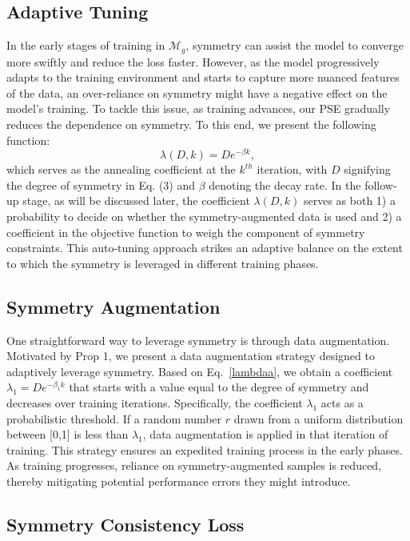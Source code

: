 \documentclass[letterpaper]{article} %
\theoremstyle{definition}
\begin{document}
\subsection{Adaptive Tuning}
In the early stages of training in $\mathcal{M}_g$, symmetry can assist the model to converge more swiftly and reduce the loss faster. However, as the model progressively adapts to the training environment and starts to capture more nuanced features of the data, an over-reliance on symmetry might have a negative effect on the model's training. To tackle this issue, as training advances, our PSE gradually reduces the dependence on symmetry. To this end, we present the following function:
\begin{equation}
\lambda (D,k) = D e^{-\beta k}, \label{lambdaa}
\end{equation}
which serves as the annealing coefficient at the $ k^{th}$ iteration, with $D$ signifying the degree of symmetry in Eq. (3) and $\beta$ denoting the decay rate. In the follow-up stage, as will be discussed later, the coefficient $ \lambda (D,k) $ serves as both  1) a probability to decide on whether the symmetry-augmented data is used and 2) a coefficient in the objective function to weigh the component of symmetry constraints. This auto-tuning approach strikes an adaptive balance on the extent to which the symmetry is leveraged in different training phases.


\subsection{Symmetry Augmentation}

One straightforward way to leverage symmetry is through data augmentation. Motivated by Prop 1, we present a data augmentation strategy designed to adaptively leverage symmetry. Based on Eq.~\eqref{lambdaa}, we obtain a coefficient $ \lambda_1 =D e^{-\beta_1 k}$ that starts with a value equal to the degree of symmetry and decreases over training iterations. Specifically, the coefficient $ \lambda_1 $ acts as a probabilistic threshold. If a random number $ r $ drawn from a uniform distribution between [0,1] is less than $ \lambda_1 $, data augmentation is applied in that iteration of training. This strategy ensures an expedited training process in the early phases. As training progresses, reliance on symmetry-augmented samples is reduced, thereby mitigating potential performance errors they might introduce.
\subsection{Symmetry Consistency Loss}
\end{document}
